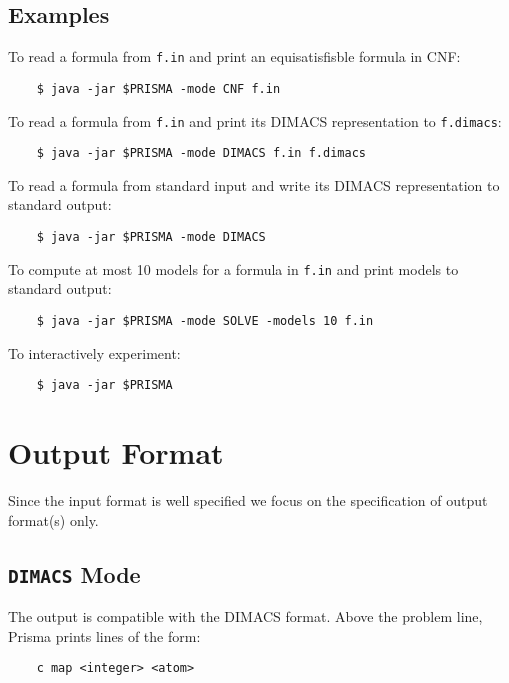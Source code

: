 \documentclass{llncs}
\begin{document}
\begin{enumerate}
\subsection{Examples}

To read a formula from \texttt{f.in} and print an equisatisfisble formula in CNF:

	\begin{verbatim}
	$ java -jar $PRISMA -mode CNF f.in
	\end{verbatim}

To read a formula from \texttt{f.in} and print its DIMACS representation to \texttt{f.dimacs}:

	\begin{verbatim}
	$ java -jar $PRISMA -mode DIMACS f.in f.dimacs
	\end{verbatim}


To read a formula from standard input and write its DIMACS representation to standard output:

	\begin{verbatim}
	$ java -jar $PRISMA -mode DIMACS
	\end{verbatim}
	
To compute at most 10 models for a formula in \texttt{f.in} and print models to standard output:

	\begin{verbatim}
	$ java -jar $PRISMA -mode SOLVE -models 10 f.in
	\end{verbatim}

To interactively experiment:

	\begin{verbatim}
	$ java -jar $PRISMA
	\end{verbatim}
	
\section{Output Format}

Since the input format is well specified we focus on the specification of output format(s) only.

\subsection{\texttt{DIMACS} Mode}

The output is compatible with the DIMACS format. Above the problem line, Prisma prints lines of the form:

	\begin{verbatim}
	c map <integer> <atom>
	\end{verbatim}


\end{enumerate}
\end{document}
